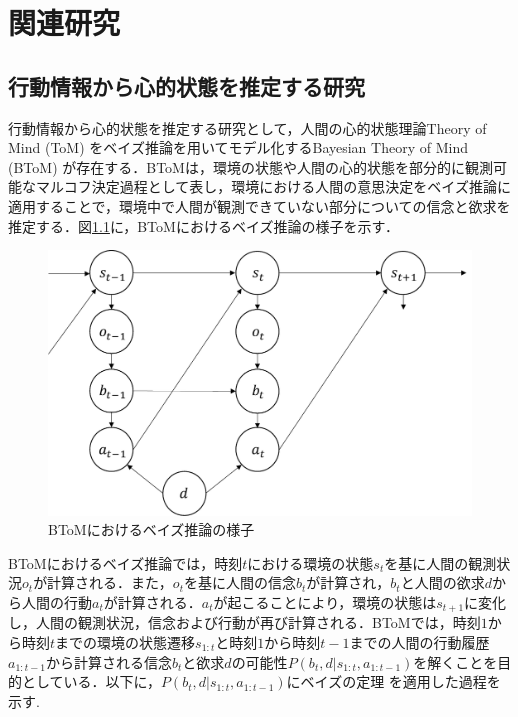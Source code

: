\chapter{関連研究}

\section{行動情報から心的状態を推定する研究}
\par
行動情報から心的状態を推定する研究として，人間の心的状態理論Theory of Mind (ToM) \cite{子安増生1997心の理論}をベイズ推論を用いてモデル化するBayesian Theory of Mind (BToM) \cite{baker2011bayesian}が存在する．BToMは，環境の状態や人間の心的状態を部分的に観測可能なマルコフ決定過程として表し，環境における人間の意思決定をベイズ推論に適用することで，環境中で人間が観測できていない部分についての信念と欲求を推定する．図\ref{fig:btom}に，BToMにおけるベイズ推論の様子を示す．
\begin{figure}[htbp]
  \begin{center}
    \includegraphics[scale=0.8]{./btom.pdf}
    \caption{BToMにおけるベイズ推論の様子}
    \label{fig:btom}
  \end{center}
\end{figure}
BToMにおけるベイズ推論では，時刻$t$における環境の状態$s_{t}$を基に人間の観測状況$o_{t}$が計算される．また，$o_{t}$を基に人間の信念$b_{t}$が計算され，$b_{t}$と人間の欲求$d$から人間の行動$a_{t}$が計算される．$a_{t}$が起こることにより，環境の状態は$s_{t+1}$に変化し，人間の観測状況，信念および行動が再び計算される．BToMでは，時刻$1$から時刻$t$までの環境の状態遷移$s_{1:t}$と時刻$1$から時刻$t-1$までの人間の行動履歴$a_{1:t-1}$から計算される信念$b_t$と欲求$d$の可能性$P(b_t,d|s_{1:t},a_{1:t-1})$を解くことを目的としている．以下に，$P(b_t,d|s_{1:t},a_{1:t-1})$にベイズの定理 \cite{ベイズ}を適用した過程を示す.
